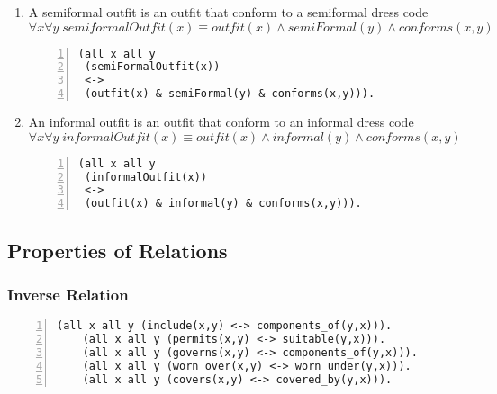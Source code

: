 \documentclass[paper=a4, fontsize=11pt]{scrartcl} %
\numberwithin{equation}{section} %
\numberwithin{figure}{section} %
\numberwithin{table}{section} %
\begin{document}
\begin{enumerate}
	
	\item A semiformal outfit is an outfit that conform to a semiformal dress code
	\begin{equation*}
		\forall x \forall y \; semiformalOutfit(x) \equiv outfit(x) \land semiFormal(y) \land conforms(x,y)
	\end{equation*}
	\begin{Verbatim}[frame=lines,gobble=2,numbers=left]
 (all x all y 
 (semiFormalOutfit(x))
 <->
 (outfit(x) & semiFormal(y) & conforms(x,y))).
	\end{Verbatim}


	\item An informal outfit is an outfit that conform to an informal dress code
	\begin{equation*}
		\forall x \forall y \; informalOutfit(x) \equiv outfit(x) \land informal(y) \land conforms(x,y)
	\end{equation*}
	\begin{Verbatim}[frame=lines,gobble=2,numbers=left]
 (all x all y 
 (informalOutfit(x))
 <->
 (outfit(x) & informal(y) & conforms(x,y))).
	\end{Verbatim}	


\end{enumerate}
\clearpage

\subsection{Properties of Relations}
\subsubsection{Inverse Relation}
	\begin{Verbatim}[frame=lines,gobble=2,numbers=left]
	(all x all y (include(x,y) <-> components_of(y,x))).
	(all x all y (permits(x,y) <-> suitable(y,x))).
	(all x all y (governs(x,y) <-> components_of(y,x))).
	(all x all y (worn_over(x,y) <-> worn_under(y,x))).
	(all x all y (covers(x,y) <-> covered_by(y,x))).
	\end{Verbatim}	
\end{document}
